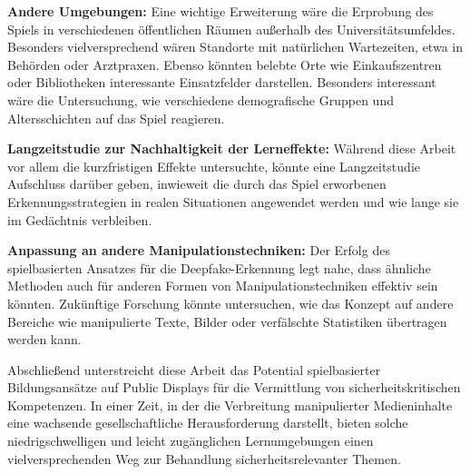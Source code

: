\textbf{Andere Umgebungen:}
Eine wichtige Erweiterung wäre die Erprobung des Spiels in verschiedenen öffentlichen Räumen außerhalb des Universitätsumfeldes. 
Besonders vielversprechend wären Standorte mit natürlichen Wartezeiten, etwa in Behörden oder Arztpraxen. 
Ebenso könnten belebte Orte wie Einkaufszentren oder Bibliotheken interessante Einsatzfelder darstellen. 
Besonders interessant wäre die Untersuchung, wie verschiedene demografische Gruppen und Altersschichten auf das Spiel reagieren.

\textbf{Langzeitstudie zur Nachhaltigkeit der Lerneffekte:}
Während diese Arbeit vor allem die kurzfristigen Effekte untersuchte, könnte eine Langzeitstudie Aufschluss darüber geben, 
inwieweit die durch das Spiel erworbenen Erkennungsstrategien in realen Situationen angewendet werden und wie lange sie im Gedächtnis verbleiben.

\textbf{Anpassung an andere Manipulationstechniken:}
Der Erfolg des spielbasierten Ansatzes für die Deepfake-Erkennung legt nahe, 
dass ähnliche Methoden auch für anderen Formen von Manipulationstechniken effektiv sein könnten. 
Zukünftige Forschung könnte untersuchen, wie das Konzept auf andere Bereiche wie manipulierte Texte, Bilder oder verfälschte Statistiken übertragen werden kann.

Abschließend unterstreicht diese Arbeit das Potential spielbasierter Bildungsansätze auf Public Displays für die Vermittlung von sicherheitskritischen Kompetenzen. 
In einer Zeit, in der die Verbreitung manipulierter Medieninhalte eine wachsende gesellschaftliche Herausforderung darstellt, 
bieten solche niedrigschwelligen und leicht zugänglichen Lernumgebungen einen vielversprechenden Weg zur Behandlung sicherheitsrelevanter Themen.
